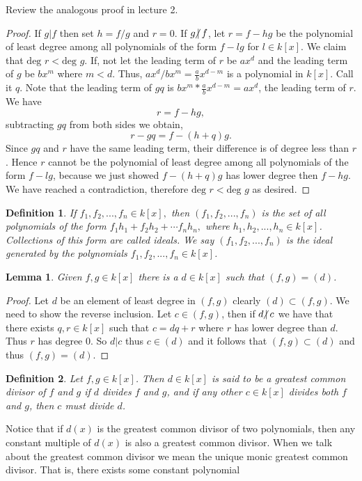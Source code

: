 \documentclass{article}
\theoremstyle{problemstyle}
\newtheorem{lemma}{Lemma}
\newtheorem{definition}{Definition}
\newcommand{\ndiv}{\hspace{-4pt}\not|\hspace{2pt}}
\begin{document}
Review the analogous proof in lecture 2.  

\begin{proof}
If $g|f$ then set $h = f/g$ and $r = 0$. If $g \ndiv f$, let $r = f-hg$ be the polynomial of least degree among all polynomials of the form $f-lg$ for $l \in k[x]$. We claim that $\text{deg }r < \text{deg }g$. If, not let the leading term of $r$ be $ax^d$ and the leading term of $g$ be $bx^m$ where $m < d$. Thus, $ax^d/bx^m = \frac{a}{b}x^{d-m}$ is a polynomial in $k[x]$.  Call it $q$. Note that the leading term of $gq$ is $bx^m * \frac{a}{b}x^{d-m} = ax^d$, the leading term of $r$. We have $$r = f-hg,$$ subtracting $gq$ from both sides we obtain, $$r-gq = f-(h+q)g.$$ Since $gq$ and $r$ have the same leading term, their difference is of degree less than $r$. Hence $r$ cannot be the polynomial of least degree among all polynomials of the form $f-lg$, because we just showed $f-(h+q)g$ has lower degree then $f-hg$. We have reached a contradiction, therefore $\text{deg }r < \text{deg }g$ as desired. 
\end{proof}

\begin{definition}
If $f_1,f_2,...,f_n \in k[x],$ then $(f_1,f_2,...,f_n)$ is the set of all polynomials of the form $f_1h_1+f_2h_2+\cdots f_nh_n,$ where $h_1,h_2,...,h_n \in k[x]$. Collections of this form are called ideals. We say $(f_1,f_2,...,f_n)$ is the ideal generated by the polynomials $f_1,f_2,...,f_n \in k[x]$. 
\end{definition}

\begin{lemma}
Given $f,g \in k[x]$ there is a $d \in k[x]$ such that $(f,g) = (d)$. 
\end{lemma}

\begin{proof}
Let $d$ be an element of least degree in $(f,g)$ clearly $(d) \subset (f,g)$. We need to show the reverse inclusion. Let $c \in (f,g)$, then if $d \ndiv c$ we have that there exists $q,r \in k[x]$ such that $c = dq + r$ where $r$ has lower degree than $d$. Thus $r$ has degree $0$. So $d|c$ thus $c \in (d)$ and it follows that $(f,g) \subset (d)$ and thus $(f,g) = (d)$. 
\end{proof}

\begin{definition}
Let $f,g \in k[x]$. Then $d \in k[x]$ is said to be a greatest common divisor of $f$ and $g$ if $d$ divides $f$ and $g$, and if any other $c \in k[x]$ divides both $f$ and $g$, then $c$ must divide $d$.  
\end{definition}

Notice that if $d(x)$ is the greatest common divisor of two polynomials, then any constant multiple of $d(x)$ is also a greatest common divisor. When we talk about the greatest common divisor we mean the unique monic greatest common divisor. That is, there exists some constant polynomial    
\end{document}
